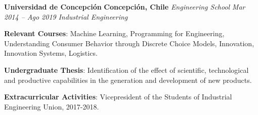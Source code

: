 \item
\headerrow
{\textbf{Universidad de Concepción}}
{\textbf{Concepción, Chile}}
\headerrow
{\emph{Engineering School}}
{\emph{Mar 2014 -- Ago 2019}}
{\emph{Industrial Engineering}}
\begin{itemize*}
    \item \textbf{Relevant Courses}: Machine Learning, Programming for Engineering, 
    Understanding Consumer Behavior through Discrete Choice Models, Innovation, 
    Innovation Systems, Logistics.
    \item \textbf{Undergraduate Thesis}: Identification of the effect of scientific, 
    technological and productive capabilities in the generation and development of 
    new products.
    \item \textbf{Extracurricular Activities}: Vicepresident of the Students of Industrial
    Engineering Union, 2017-2018.
\end{itemize*}